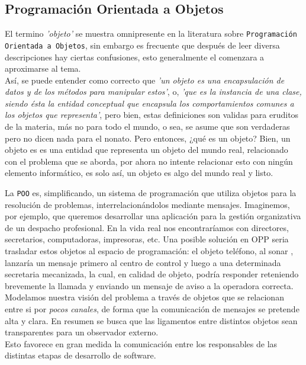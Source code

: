 \documentclass[12pt]{book} %
\begin{document}
		\subsection{Programación Orientada a Objetos \label{poo}}
			El termino \textit{'objeto'} se muestra omnipresente en la literatura sobre \texttt{Programación Orientada a Objetos}, sin 
			embargo es frecuente que después de leer diversa descripciones hay ciertas confusiones, esto generalmente el comenzara a 
			aproximarse al tema.\\
			Así, se puede entender como correcto que \textit{'un objeto es una encapsulación de datos y de los métodos para manipular estos'},
			o, \textit{'que es la instancia de una clase, siendo ésta la entidad conceptual que encapsula los comportamientos comunes a los 
			objetos que representa'}, pero bien, estas definiciones son validas para eruditos de la materia, más no para todo el mundo, o sea, 
			se asume que son verdaderas pero no dicen nada para el nonato.
			Pero entonces, ¿qué es un objeto? Bien, un objeto es es una entidad que representa un objeto del mundo real, relacionado con
			el problema que se aborda, por ahora no intente relacionar esto con ningún elemento informático, es solo así, un objeto es algo
			del mundo real y listo.
			
			La \texttt{POO} es, simplificando, un sistema de programación que utiliza objetos para la resolución de problemas, 
			interrelacionándolos mediante mensajes.
			Imaginemos, por ejemplo, que queremos desarrollar una aplicación para la gestión organizativa de un despacho profesional. En la vida
			real nos encontraríamos con directores, secretarios, computadoras, impresoras, etc. Una posible solución en OPP seria trasladar estos 
			objetos al espacio de programación: el objeto teléfono, al sonar , lanzaría un mensaje primero al centro de control y luego a una 
			determinada 	secretaria mecanizada, la cual, en calidad de objeto, podría responder reteniendo brevemente la llamada y enviando un 
			mensaje de aviso a la operadora correcta.\\
			Modelamos nuestra visión del problema a través de objetos que se relacionan entre si por \textit{pocos canales}, de forma que la 
			comunicación de mensajes se pretende alta y clara. En resumen se busca que las ligamentos entre distintos objetos sean transparentes para un 	
			observador externo.\\
			Esto favorece en gran medida la comunicación entre los responsables de las distintas etapas de desarrollo de software.
			
\end{document}
